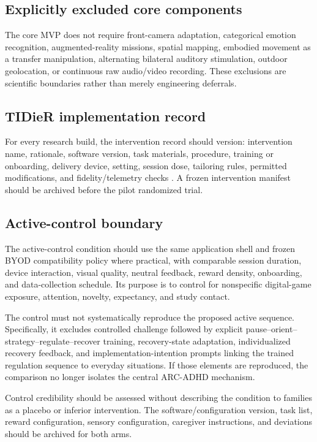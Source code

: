 \subsection{Explicitly excluded core components}

The core MVP does not require front-camera adaptation, categorical emotion recognition, augmented-reality missions, spatial mapping, embodied movement as a transfer manipulation, alternating bilateral auditory stimulation, outdoor geolocation, or continuous raw audio/video recording. These exclusions are scientific boundaries rather than merely engineering deferrals.

\subsection{TIDieR implementation record}

For every research build, the intervention record should version: intervention name, rationale, software version, task materials, procedure, training or onboarding, delivery device, setting, session dose, tailoring rules, permitted modifications, and fidelity/telemetry checks \parencite{hoffmann2014tidier}. A frozen intervention manifest should be archived before the pilot randomized trial.


\subsection{Active-control boundary}

The active-control condition should use the same application shell and frozen BYOD compatibility policy where practical, with comparable session duration, device interaction, visual quality, neutral feedback, reward density, onboarding, and data-collection schedule. Its purpose is to control for nonspecific digital-game exposure, attention, novelty, expectancy, and study contact.

The control must not systematically reproduce the proposed active sequence. Specifically, it excludes controlled challenge followed by explicit pause--orient--strategy--regulate--recover training, recovery-state adaptation, individualized recovery feedback, and implementation-intention prompts linking the trained regulation sequence to everyday situations. If those elements are reproduced, the comparison no longer isolates the central ARC-ADHD mechanism.

Control credibility should be assessed without describing the condition to families as a placebo or inferior intervention. The software/configuration version, task list, reward configuration, sensory configuration, caregiver instructions, and deviations should be archived for both arms.
